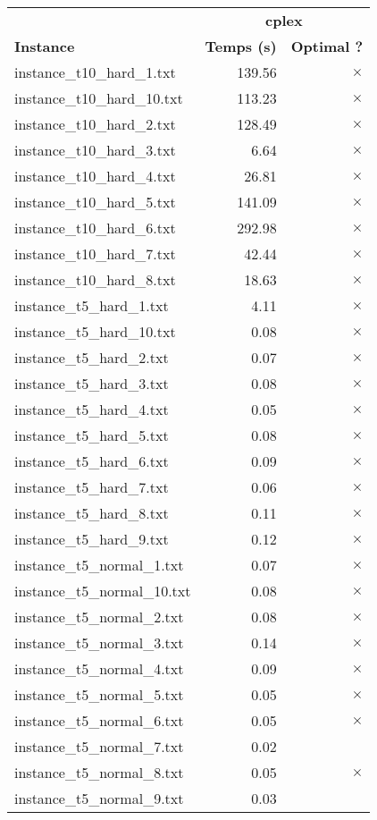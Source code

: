 \documentclass{article}
\begin{document}
\begin{center}
\renewcommand{\arraystretch}{1.4} 
\begin{tabular}{lrr}
	\hline
 & \multicolumn{2}{c}{\textbf{cplex}}\\
\textbf{Instance}  & \textbf{Temps (s)} & \textbf{Optimal ?} \\\hline

instance\_t10\_hard\_1.txt & 139.56 & 
$\times$
\\
instance\_t10\_hard\_10.txt & 113.23 & 
$\times$
\\
instance\_t10\_hard\_2.txt & 128.49 & 
$\times$
\\
instance\_t10\_hard\_3.txt & 6.64 & 
$\times$
\\
instance\_t10\_hard\_4.txt & 26.81 & 
$\times$
\\
instance\_t10\_hard\_5.txt & 141.09 & 
$\times$
\\
instance\_t10\_hard\_6.txt & 292.98 & 
$\times$
\\
instance\_t10\_hard\_7.txt & 42.44 & 
$\times$
\\
instance\_t10\_hard\_8.txt & 18.63 & 
$\times$
\\
instance\_t5\_hard\_1.txt & 4.11 & 
$\times$
\\
instance\_t5\_hard\_10.txt & 0.08 & 
$\times$
\\
instance\_t5\_hard\_2.txt & 0.07 & 
$\times$
\\
instance\_t5\_hard\_3.txt & 0.08 & 
$\times$
\\
instance\_t5\_hard\_4.txt & 0.05 & 
$\times$
\\
instance\_t5\_hard\_5.txt & 0.08 & 
$\times$
\\
instance\_t5\_hard\_6.txt & 0.09 & 
$\times$
\\
instance\_t5\_hard\_7.txt & 0.06 & 
$\times$
\\
instance\_t5\_hard\_8.txt & 0.11 & 
$\times$
\\
instance\_t5\_hard\_9.txt & 0.12 & 
$\times$
\\
instance\_t5\_normal\_1.txt & 0.07 & 
$\times$
\\
instance\_t5\_normal\_10.txt & 0.08 & 
$\times$
\\
instance\_t5\_normal\_2.txt & 0.08 & 
$\times$
\\
instance\_t5\_normal\_3.txt & 0.14 & 
$\times$
\\
instance\_t5\_normal\_4.txt & 0.09 & 
$\times$
\\
instance\_t5\_normal\_5.txt & 0.05 & 
$\times$
\\
instance\_t5\_normal\_6.txt & 0.05 & 
$\times$
\\
instance\_t5\_normal\_7.txt & 0.02 & 
\\
instance\_t5\_normal\_8.txt & 0.05 & 
$\times$
\\
instance\_t5\_normal\_9.txt & 0.03 & 
\\
\hline\end{tabular}
\end{center}
\end{document}
